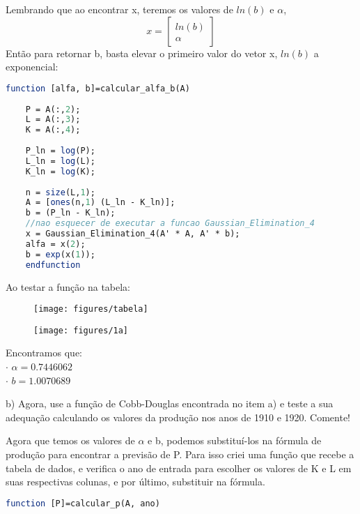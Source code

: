 \documentclass[leqno]{article}
\numberwithin{equation}{section}
\begin{document}
\begin{enumerate}
	Lembrando que ao encontrar x, teremos os valores de $ln(b)$ e $\alpha$, $$x = \begin{bmatrix}
		ln(b) \\
		\alpha
	\end{bmatrix}$$
	Então para retornar b, basta elevar o primeiro valor do vetor x, $ln(b)$ a exponencial:
	
\begin{sol}			
	\begin{lstlisting}[style=mystyle, language=Scilab]
	function [alfa, b]=calcular_alfa_b(A)
	
	P = A(:,2);
	L = A(:,3);
	K = A(:,4);
	
	P_ln = log(P);
	L_ln = log(L);
	K_ln = log(K);
	
	n = size(L,1);
	A = [ones(n,1) (L_ln - K_ln)];
	b = (P_ln - K_ln);
	//nao esquecer de executar a funcao Gaussian_Elimination_4
	x = Gaussian_Elimination_4(A' * A, A' * b);
	alfa = x(2);
	b = exp(x(1));
	endfunction
	\end{lstlisting}
	\newpage
	Ao testar a função na tabela:
	
	\begin{figure}[H]
		\centering
		\texttt{[image: figures/tabela]}
	\end{figure}

	\begin{figure}[H]
		\centering
		\texttt{[image: figures/1a]}
	\end{figure}

	Encontramos que:\\
	$\cdot$ $\alpha = 0.7446062$\\
	$\cdot$ $b = 1.0070689$
	\begin{tcolorbox}[colback=gray!5,colframe=gray!40!black]	
		b) Agora, use a função de Cobb-Douglas encontrada no item a) e teste a
		sua adequação calculando os valores da produção nos anos de 1910 e
		1920. Comente!
	\end{tcolorbox}
	
	Agora que temos os valores de $\alpha$ e b, podemos substituí-los na fórmula de produção para encontrar a previsão de P. Para isso criei uma função que recebe a tabela de dados, e verifica o ano de entrada para escolher os valores de K e L em suas respectivas colunas, e por último, substituir na fórmula.
	
	\begin{lstlisting}[style=mystyle, language=Scilab]
function [P]=calcular_p(A, ano)


\end{lstlisting}
\end{sol}
\end{enumerate}
\end{document}
